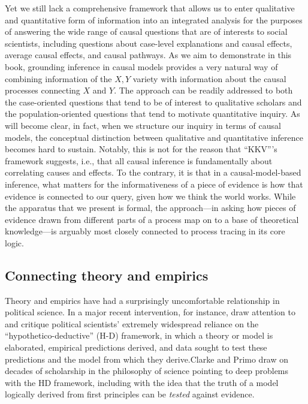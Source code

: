 \documentclass[
  12pt,
]{book}
\begin{document}
Yet we still lack a comprehensive framework that allows us to enter qualitative and quantitative form of information into an integrated analysis for the purposes of answering the wide range of causal questions that are of interests to social scientists, including questions about case-level explanations and causal effects, average causal effects, and causal pathways. As we aim to demonstrate in this book, grounding inference in causal models provides a very natural way of combining information of the \(X,Y\) variety with information about the causal processes connecting \(X\) and \(Y\). The approach can be readily addressed to both the case-oriented questions that tend to be of interest to qualitative scholars and the population-oriented questions that tend to motivate quantitative inquiry. As will become clear, in fact, when we structure our inquiry in terms of causal models, the conceptual distinction between qualitative and quantitative inference becomes hard to sustain. Notably, this is not for the reason that ``KKV'''s framework suggests, i.e., that all causal inference is fundamentally about correlating causes and effects. To the contrary, it is that in a causal-model-based inference, what matters for the informativeness of a piece of evidence is how that evidence is connected to our query, given how we think the world works. While the apparatus that we present is formal, the approach---in asking how pieces of evidence drawn from different parts of a process map on to a base of theoretical knowledge---is arguably most closely connected to process tracing in its core logic.

\hypertarget{connecting-theory-and-empirics}{%
\subsection{Connecting theory and empirics}\label{connecting-theory-and-empirics}}

Theory and empirics have had a surprisingly uncomfortable relationship in political science. In a major recent intervention, for instance, \citet{clarke2012model} draw attention to and critique political scientists' extremely widespread reliance on the ``hypothetico-deductive'' (H-D) framework, in which a theory or model is elaborated, empirical predictions derived, and data sought to test these predictions and the model from which they derive.Clarke and Primo draw on decades of scholarship in the philosophy of science pointing to deep problems with the HD framework, including with the idea that the truth of a model logically derived from first principles can be \emph{tested} against evidence.
\end{document}
